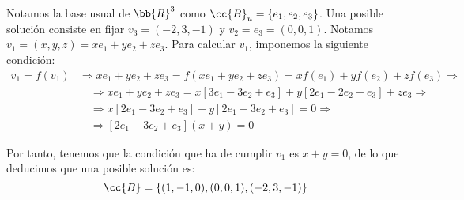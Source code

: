 \documentclass[12pt]{article}
\begin{document}
\begin{ejercicio}
\begin{enumerate}
        Notamos la base usual de $\bb{R}^3$ como $\cc{B}_u=\{e_1,e_2,e_3\}$. Una posible solución consiste en fijar $v_3=(-2,3,-1)$ y $v_2=e_3=(0,0,1)$. Notamos $v_1 = (x,y,z) = xe_1 + ye_2 + ze_3$.
        Para calcular $v_1$, imponemos la siguiente condición:
        \begin{equation*}\begin{split}
            v_1 = f(v_1) &\Longrightarrow xe_1 + ye_2 + ze_3 = f(xe_1 + ye_2 + ze_3)= xf(e_1) + yf(e_2) + zf(e_3)
            \Longrightarrow \\
            &\quad \Longrightarrow
            xe_1 + ye_2 + ze_3 = x[3e_1 -3e_2 +e_3] + y[2e_1-2e_2+e_3] + ze_3 \Longrightarrow \\
            &\quad \Longrightarrow
            x[2e_1 -3e_2 +e_3] + y[2e_1-3e_2+e_3] = 0 \Longrightarrow \\
            &\quad \Longrightarrow [2e_1 -3e_2 +e_3](x+y)=0
        \end{split}\end{equation*}

        Por tanto, tenemos que la condición que ha de cumplir $v_1$ es $x+y=0$, de lo que deducimos que una posible solución es:
        \begin{equation*}
            \cc{B}=\{(1,-1, 0), (0,0,1), (-2, 3, -1)\}
        \end{equation*}
    \end{enumerate}
\end{ejercicio}
\end{document}
